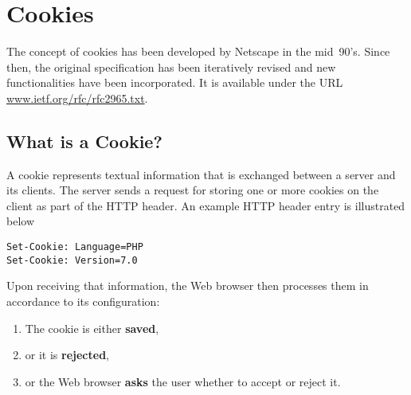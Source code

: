 \documentclass[a4paper, justified, notoc]{tufte-handout} %
\begin{document}
\section{Cookies} %
\label{sec:cookies}
The concept of cookies has been developed by Netscape in the mid~90's. Since then, the original specification has been iteratively revised and new functionalities have been incorporated. It is available under the URL \url{www.ietf.org/rfc/rfc2965.txt}.

\subsection{What is a Cookie?} %
\label{sub:what_is_a_cookie}
A cookie represents textual information that is exchanged between a server and its clients. 
The server sends a request for storing one or more cookies on the client as part of the HTTP header.
An example HTTP header entry is illustrated below
\begin{Verbatim}
Set-Cookie: Language=PHP
Set-Cookie: Version=7.0
\end{Verbatim}
Upon receiving that information, the Web browser then processes them in accordance to its configuration:
\begin{enumerate}
	\item The cookie is either \textbf{saved},
	\item or it is \textbf{rejected},
	\item or the Web browser \textbf{asks} the user whether to accept or reject it.
\end{enumerate}
\end{document}
